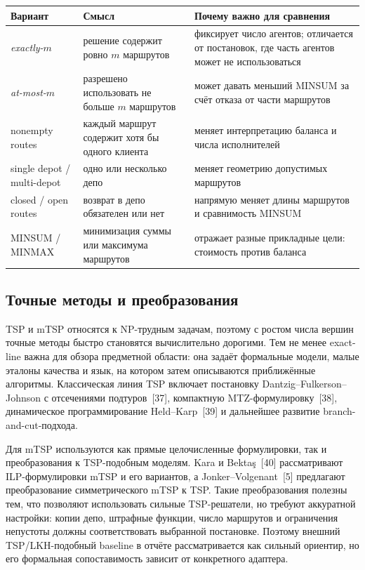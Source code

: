 \documentclass[14pt,a4paper]{extarticle}
\newcommand{\source}[1]{[#1]}
\begin{document}
\begin{longtable}{>{\raggedright\arraybackslash}p{}>{\raggedright\arraybackslash}p{}>{\raggedright\arraybackslash}p{}}
\toprule
\textbf{Вариант} & \textbf{Смысл} & \textbf{Почему важно для сравнения}\\
\midrule
\endhead
\textit{exactly-$m$} & решение содержит ровно $m$ маршрутов & фиксирует число агентов; отличается от постановок, где часть агентов может не использоваться\\
\textit{at-most-$m$} & разрешено использовать не больше $m$ маршрутов & может давать меньший MINSUM за счёт отказа от части маршрутов\\
nonempty routes & каждый маршрут содержит хотя бы одного клиента & меняет интерпретацию баланса и числа исполнителей\\
single depot / multi-depot & одно или несколько депо & меняет геометрию допустимых маршрутов\\
closed / open routes & возврат в депо обязателен или нет & напрямую меняет длины маршрутов и сравнимость MINSUM\\
MINSUM / MINMAX & минимизация суммы или максимума маршрутов & отражает разные прикладные цели: стоимость против баланса\\
\bottomrule
\end{longtable}

\subsection{Точные методы и преобразования}

TSP и mTSP относятся к NP-трудным задачам, поэтому с ростом числа вершин точные методы быстро становятся вычислительно дорогими. Тем не менее exact-line важна для обзора предметной области: она задаёт формальные модели, малые эталоны качества и язык, на котором затем описываются приближённые алгоритмы. Классическая линия TSP включает постановку Dantzig--Fulkerson--Johnson с отсечениями подтуров~\source{37}, компактную MTZ-формулировку~\source{38}, динамическое программирование Held--Karp~\source{39} и дальнейшее развитие branch-and-cut-подхода.

Для mTSP используются как прямые целочисленные формулировки, так и преобразования к TSP-подобным моделям. Kara и Bektaş~\source{40} рассматривают ILP-формулировки mTSP и его вариантов, а Jonker--Volgenant~\source{5} предлагают преобразование симметрического mTSP к TSP. Такие преобразования полезны тем, что позволяют использовать сильные TSP-решатели, но требуют аккуратной настройки: копии депо, штрафные функции, число маршрутов и ограничения непустоты должны соответствовать выбранной постановке. Поэтому внешний TSP/LKH-подобный baseline в отчёте рассматривается как сильный ориентир, но его формальная сопоставимость зависит от конкретного адаптера.
\end{document}
